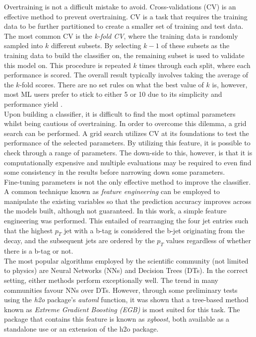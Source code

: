 Overtraining is not a difficult mistake to avoid. Cross-validations (CV) is an effective method to prevent overtraining. CV is a task that requires the training data to be further partitioned to create a smaller set of training and test data. The most common CV is the \textit{k-fold CV}, where the training data is randomly sampled into $k$ different subsets. By selecting $k-1$ of these subsets as the training data to build the classifier on, the remaining subset is used to validate this model on. This procedure is repeated $k$ times through each split, where each performance is scored. The overall result typically involves taking the average of the $k$-fold scores.  There are no set rules on what the best value of $k$ is, however, most ML users prefer to stick to either 5 or 10 due to its simplicity and performance yield \cite{james2013introduction}. \\

Upon building a classifier, it is difficult to find the most optimal parameters whilst being cautious of overtraining. In order to overcome this dilemma, a grid search can be performed. A grid search utilizes CV at its foundations to test the performance of the selected parameters. By utilizing this feature, it is possible to check through a range of parameters. The down-side to this, however, is that it is computationally expensive and multiple evaluations may be required to even find some consistency in the results before narrowing down some parameters. \\

Fine-tuning parameters is not the only effective method to improve the classifier. A common technique known as \textit{feature engineering} can be employed to manipulate the existing variables so that the prediction accuracy improves across the models built, although not guaranteed. In this work, a simple feature engineering was performed. This entailed of rearranging the four jet entries such that the highest $p_T$ jet with a b-tag is considered the b-jet originating from the decay, and the subsequent jets are ordered by the $p_T$ values regardless of whether there is a b-tag or not. \\

The most popular algorithms employed by the scientific community (not limited to physics) are Neural Networks (NNs) and Decision Trees (DTs). In the correct setting, either methods perform exceptionally well. The trend in many communities favour NNs over DTs. However, through some preliminary tests using the \textit{h2o} package's \textit{automl} function, it was shown that a tree-based method known as \textit{Extreme Gradient Boosting (EGB)} is most suited for this task. The package that contains this feature is known as \textit{xgboost}, both available as a standalone use or an extension of the h2o package. \\

